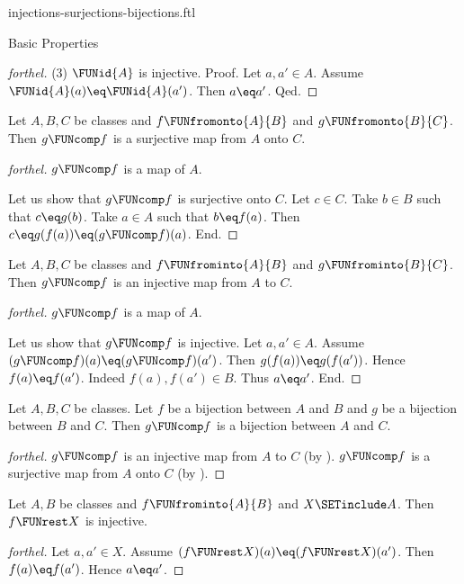 \documentclass{naproche-library}
\begin{document}
\begin{smodule}[title={Injective, Surjective and Bijective Maps}]{injections-surjections-bijections.ftl}
\begin{sfragment}{Basic Properties}
\begin{proof}[forthel]
    (3) $\FUNid{A}$ is injective. \newline
    Proof.
      Let $a, a' \in A$.
      Assume $\FUNid{A}(a) \eq \FUNid{A}(a')$.
      Then $a \eq a'$.
    Qed.
  \end{proof}

  \begin{proposition}[forthel,id=FOUNDATIONS_08_8542698338254848]
    Let $A, B, C$ be classes and $f \FUNfromonto{A}{B}$ and $g \FUNfromonto{B}{C}$.
    Then $g \FUNcomp f$ is a surjective map from $A$ onto $C$.
  \end{proposition}
  \begin{proof}[forthel]
    $g \FUNcomp f$ is a map of $A$.

    Let us show that $g \FUNcomp f$ is surjective onto $C$.
      Let $c \in C$.
      Take $b \in B$ such that $c \eq g(b)$.
      Take $a \in A$ such that $b \eq f(a)$.
      Then $c \eq g(f(a)) \eq (g \FUNcomp f)(a)$.
    End.
  \end{proof}

  \begin{proposition}[forthel,id=FOUNDATIONS_08_3367836856614912]
    Let $A, B, C$ be classes and $f \FUNfrominto{A}{B}$ and $g \FUNfrominto{B}{C}$.
    Then $g \FUNcomp f$ is an injective map from $A$ to $C$.
  \end{proposition}
  \begin{proof}[forthel]
    $g \FUNcomp f$ is a map of $A$.

    Let us show that $g \FUNcomp f$ is injective.
      Let $a, a' \in A$.
      Assume $(g \FUNcomp f)(a) \eq (g \FUNcomp f)(a')$.
      Then $g(f(a)) \eq g(f(a'))$.
      Hence $f(a) \eq f(a')$.
      Indeed $f(a), f(a') \in B$.
      Thus $a \eq a'$.
    End.
  \end{proof}

  \begin{corollary}[forthel,id=FOUNDATIONS_08_6435206693126144]
    Let $A, B, C$ be classes.
    Let $f$ be a bijection between $A$ and $B$ and $g$ be a bijection between $B$ and $C$.
    Then $g \FUNcomp f$ is a bijection between $A$ and $C$.
  \end{corollary}
  \begin{proof}[forthel]
    $g \FUNcomp f$ is an injective map from $A$ to $C$ (by ).
    $g \FUNcomp f$ is a surjective map from $A$ onto $C$ (by ).
  \end{proof}

  \begin{proposition}[forthel,id=FOUNDATIONS_08_2621531811217408]
    Let $A, B$ be classes and $f \FUNfrominto{A}{B}$ and $X \SETinclude A$.
    Then $f \FUNrest X$ is injective.
  \end{proposition}
  \begin{proof}[forthel]
    Let $a, a' \in X$.
    Assume $(f \FUNrest X)(a) \eq (f \FUNrest X)(a')$.
    Then $f(a) \eq f(a')$.
    Hence $a \eq a'$.
  \end{proof}


\end{sfragment}
\end{smodule}
\end{document}
